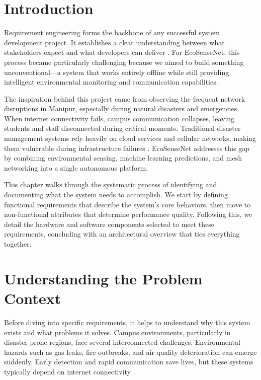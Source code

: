 \section*{Introduction}

Requirement engineering forms the backbone of any successful system development project. It establishes a clear understanding between what stakeholders expect and what developers can deliver \cite{sommerville2011software}. For EcoSenseNet, this process became particularly challenging because we aimed to build something unconventional—a system that works entirely offline while still providing intelligent environmental monitoring and communication capabilities.

The inspiration behind this project came from observing the frequent network disruptions in Manipur, especially during natural disasters and emergencies. When internet connectivity fails, campus communication collapses, leaving students and staff disconnected during critical moments. Traditional disaster management systems rely heavily on cloud services and cellular networks, making them vulnerable during infrastructure failures \cite{reuter2013social}. EcoSenseNet addresses this gap by combining environmental sensing, machine learning predictions, and mesh networking into a single autonomous platform.

This chapter walks through the systematic process of identifying and documenting what the system needs to accomplish. We start by defining functional requirements that describe the system's core behaviors, then move to non-functional attributes that determine performance quality. Following this, we detail the hardware and software components selected to meet these requirements, concluding with an architectural overview that ties everything together.

\section{Understanding the Problem Context}

Before diving into specific requirements, it helps to understand why this system exists and what problems it solves. Campus environments, particularly in disaster-prone regions, face several interconnected challenges. Environmental hazards such as gas leaks, fire outbreaks, and air quality deterioration can emerge suddenly. Early detection and rapid communication save lives, but these systems typically depend on internet connectivity \cite{gubbi2013internet}.

